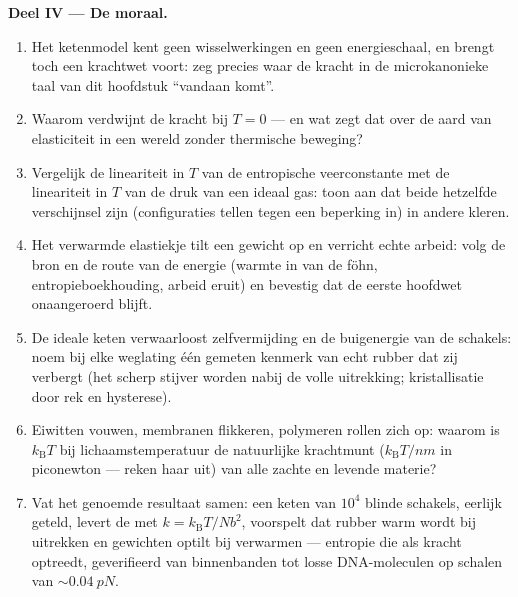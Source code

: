 \begin{problem}
\medskip\noindent\textbf{Deel IV --- De moraal.}
\begin{enumerate}[resume]
  \item Het ketenmodel kent geen wisselwerkingen en geen energieschaal, en
        brengt toch een krachtwet voort: zeg precies waar de kracht in de
        microkanonieke taal van dit hoofdstuk ``vandaan komt''.
  \item Waarom verdwijnt de kracht bij $T = 0$ --- en wat zegt dat over de
        aard van elasticiteit in een wereld zonder thermische beweging?
  \item Vergelijk de lineariteit in $T$ van de entropische veerconstante
        met de lineariteit in $T$ van de druk van een ideaal gas: toon aan
        dat beide hetzelfde
        verschijnsel zijn (configuraties tellen tegen een beperking in) in
        andere kleren.
  \item Het verwarmde elastiekje tilt een gewicht op en verricht echte
        arbeid: volg de bron en de route van de energie (warmte in van de
        föhn, entropieboekhouding, arbeid eruit) en bevestig dat de eerste
        hoofdwet onaangeroerd blijft.
  \item De ideale keten verwaarloost zelfvermijding en de buigenergie van
        de schakels: noem bij elke weglating één gemeten kenmerk van echt
        rubber dat zij verbergt (het scherp stijver worden nabij de volle
        uitrekking; kristallisatie door rek en hysterese).
  \item Eiwitten vouwen, membranen flikkeren, polymeren rollen zich op:
        waarom is $k_{\text{B}}T$ bij lichaamstemperatuur de natuurlijke
        krachtmunt ($k_{\text{B}}T/\unit{nm}$ in piconewton --- reken haar
        uit) van alle zachte en levende materie?
  \item Vat het genoemde resultaat samen: een keten van $10^4$ blinde
        schakels, eerlijk geteld, levert de  met $k =
        k_{\text{B}}T/Nb^2$, voorspelt dat rubber warm wordt bij uitrekken
        en gewichten optilt bij verwarmen --- entropie die als kracht
        optreedt, geverifieerd van binnenbanden tot losse DNA-moleculen op
        schalen van $\sim\qty{0.04}{pN}$.
\end{enumerate}
\end{problem}
